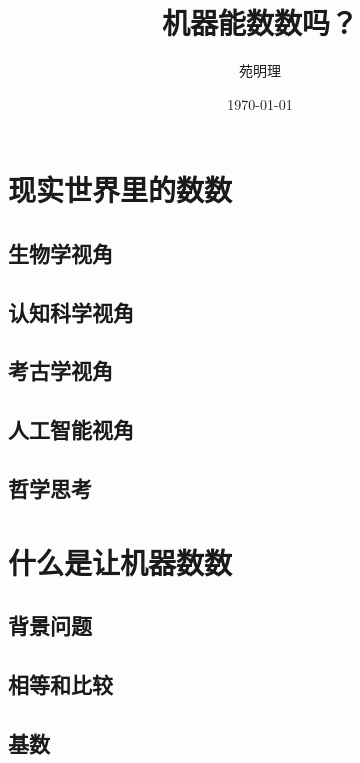\documentclass[a4paper,12pt]{article}
\title{机器能数数吗？}
\author{苑明理}
\date{\monthyeardate\today}
\begin{document}
\begingroup
\let\newpage\relax
\maketitle
\endgroup

\renewcommand\contentsname{目录}
\setcounter{tocdepth}{2}
\tableofcontents

\newpage

\section{现实世界里的数数}

\subsection{生物学视角}

\subsection{认知科学视角}

\subsection{考古学视角}

\subsection{人工智能视角}

\subsection{哲学思考}

\section{什么是让机器数数}

\subsection{背景问题}

\subsection{相等和比较}

\subsection{基数}
\end{document}
